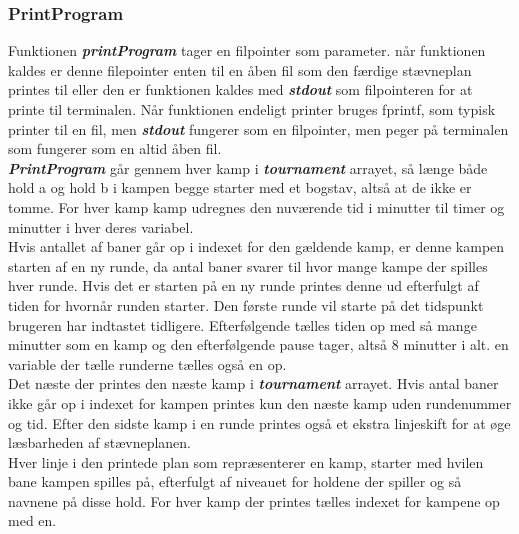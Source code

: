 \subsubsection{PrintProgram}
Funktionen \textbf{\textit{printProgram}} tager en filpointer som parameter. når funktionen kaldes er denne filepointer enten til en åben fil som den færdige stævneplan printes til eller den er funktionen kaldes med \textbf{\textit{stdout}} som filpointeren for at printe til terminalen. Når funktionen endeligt printer bruges fprintf, som typisk printer til en fil, men \textbf{\textit{stdout}} fungerer som en filpointer, men peger på terminalen som fungerer som en altid åben fil. \\
\textbf{\textit{PrintProgram}} går gennem hver kamp i \textbf{\textit{tournament}} arrayet, så længe både hold a og hold b i kampen begge starter med et bogstav, altså at de ikke er tomme. For hver kamp kamp udregnes den nuværende tid i minutter til timer og minutter i hver deres variabel.\\
 Hvis antallet af baner går op i indexet for den gældende kamp, er denne kampen starten af en ny runde, da antal baner svarer til hvor mange kampe der spilles hver runde. Hvis det er starten på en ny runde printes denne ud efterfulgt af tiden for hvornår runden starter. Den første runde vil starte på det tidspunkt brugeren har indtastet tidligere. Efterfølgende tælles tiden op med så mange minutter som en kamp og den efterfølgende pause tager, altså 8 minutter i alt. en variable der tælle runderne tælles også en op. \\
 Det næste der printes den næste kamp i \textbf{\textit{tournament}} arrayet. Hvis antal baner ikke går op i indexet for kampen printes kun den næste kamp uden rundenummer og tid. Efter den sidste kamp i en runde printes også et ekstra linjeskift for at øge læsbarheden af stævneplanen. \\
 Hver linje i den printede plan som repræsenterer en kamp, starter med hvilen bane kampen spilles på, efterfulgt af niveauet for holdene der spiller og så navnene på disse hold. For hver kamp der printes tælles indexet for kampene op med en. \\
 
